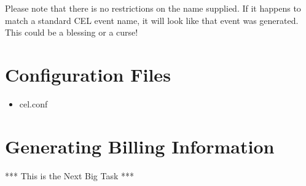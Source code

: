 Please note that there is no restrictions on the name supplied. If it happens to
match a standard CEL event name, it will look like that event was
generated. This could be a blessing or a curse!

\section{Configuration Files}

\begin{itemize}
\item cel.conf
\end{itemize}

\section{Generating Billing Information}

*** This is the Next Big Task ***


